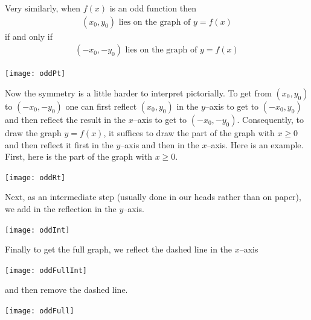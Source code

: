 Very similarly, when $f(x)$ is an odd function then
\begin{align*}
(x_0,y_0)\text{ lies on the graph of }y=f(x)
\end{align*}
if and only if
\begin{align*}
(-x_0,-y_0)\text{ lies on the graph of }y=f(x)
\end{align*}
\begin{efig}
\begin{center}
   \texttt{[image: oddPt]}
\end{center}
\end{efig}
Now the symmetry is a little harder to interpret pictorially. To get from $(x_0,y_0)$ to
$(-x_0,-y_0)$ one can first reflect $(x_0,y_0)$ in the $y$--axis to get to $(-x_0,y_0)$
and then reflect the result in the $x$--axis to get to $(-x_0,-y_0)$. Consequently, to
draw the graph $y=f(x)$, it suffices to draw the part of the graph with $x\ge 0$ and then
reflect it first in the $y$--axis and then in the $x$--axis.
Here is an example. First, here is the part of the graph with $x\ge 0$.
\begin{efig}
\begin{center}
   \texttt{[image: oddRt]}
\end{center}
\end{efig}
Next, as an intermediate step (usually done in our heads rather than on
paper), we add in the reflection in the $y$--axis.
\begin{efig}
\begin{center}
   \texttt{[image: oddInt]}
\end{center}
\end{efig}
Finally to get the full graph, we reflect the dashed line in the $x$--axis
\begin{efig}
\begin{center}
   \texttt{[image: oddFullInt]}
\end{center}
\end{efig}
and then remove the dashed line.
\begin{efig}
\begin{center}
   \texttt{[image: oddFull]}
\end{center}
\end{efig}



